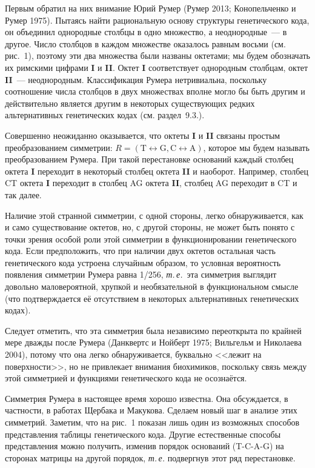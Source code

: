 \documentclass[12pt]{article}
\begin{document}
Первым обратил на них внимание Юрий Румер (Румер 2013; Конопельченко и Румер 1975). Пытаясь найти рациональную основу структуры генетического кода, он объединил однородные столбцы в одно множество, а неоднородные~--- в другое. Число столбцов в каждом множестве оказалось равным восьми (см. рис.~1), поэтому эти два множества были названы октетами; мы будем обозначать их римскими цифрами \textbf{I} и \textbf{II}. Октет \textbf{I} соответствует однородным столбцам, октет \textbf{II}~--- неоднородным. Классификация Румера нетривиальна, поскольку соотношение числа столбцов в двух множествах вполне могло бы быть другим и действительно является другим в некоторых существующих редких альтернативных генетических кодах (см. раздел~9.3.).

Совершенно неожиданно оказывается, что октеты \textbf{I} и \textbf{II} связаны простым преобразованием симметрии: $R = (\text{T} \leftrightarrow \text{G}, \text{C} \leftrightarrow \text{A})$, которое мы будем называть преобразованием Румера. При такой перестановке оснований каждый столбец октета \textbf{I} переходит в некоторый столбец октета \textbf{II} и наоборот. Например, столбец CT октета \textbf{I} переходит в столбец AG октета \textbf{II}, столбец AG переходит в CT и так далее.

Наличие этой странной симметрии, с одной стороны, легко обнаруживается, как и само существование октетов, но, с другой стороны, не может быть понято с точки зрения особой роли этой симметрии в функционировании генетического кода. Если предположить, что при наличии двух октетов остальная часть генетического кода устроена случайным образом, то условная вероятность появления симметрии Румера равна 1/256, \textit{т.\,е.}\ эта симметрия выглядит довольно маловероятной, хрупкой и необязательной в функциональном смысле (что подтверждается её отсутствием в некоторых альтернативных генетических кодах).

Следует отметить, что эта симметрия была независимо переоткрыта по крайней мере дважды после Румера (Данквертс и Нойберт 1975; Вильгельм и Николаева 2004), потому что она легко обнаруживается, буквально <<лежит на поверхности>>, но не привлекает внимания биохимиков, поскольку связь между этой симметрией и функциями генетического кода не осознаётся.

Симметрия Румера в настоящее время хорошо известна. Она обсуждается, в частности, в работах Щербака и Макукова. Сделаем новый шаг в анализе этих симметрий. Заметим, что на рис.~1 показан лишь один из возможных способов представления таблицы генетического кода. Другие естественные способы представления можно получить, изменив порядок оснований (T-C-A-G) на сторонах матрицы на другой порядок, \textit{т.\,е.} подвергнув этот ряд перестановке.
\end{document}
